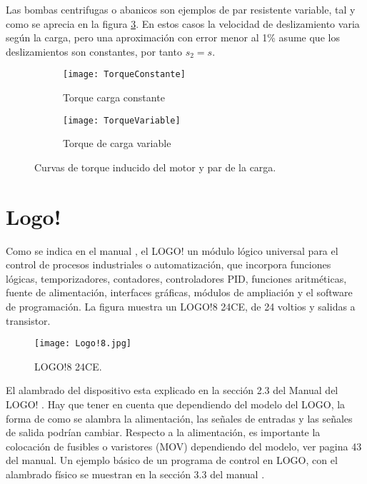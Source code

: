  Las bombas centrifugas o abanicos  son ejemplos de par resistente variable, tal y como se aprecia en la figura \ref{fig:torquevariable}. En estos casos la velocidad de deslizamiento varia según la carga, pero una aproximación con error menor al 1\% asume que los deslizamientos son constantes, por tanto  $s_2=s$.
 
 
 \begin{figure}
 	\centering
 	\begin{subfigure}[b]{0.49\textwidth}
 		\centering
 		\texttt{[image: TorqueConstante]}
 		\caption{Torque carga constante}
 		\label{fig:torqueconstante}
 	\end{subfigure}
 	\hfill
 	\begin{subfigure}[b]{0.49\textwidth}
 		\centering
 		\texttt{[image: TorqueVariable]}
 		\caption{Torque de carga variable}
 		\label{fig:torquevariable}
 	\end{subfigure}
 	\caption{Curvas de torque inducido del motor y par de la carga. \cite{Mora08}}
 \end{figure}
 

 \section{Logo!}

Como se indica en el manual \cite{LOGO1}, el LOGO! un módulo lógico universal para el control de procesos industriales o automatización, que incorpora funciones lógicas, temporizadores, contadores, controladores PID, funciones aritméticas, fuente de alimentación, interfaces gráficas, módulos de ampliación y el software de programación. La figura muestra un LOGO!8 24CE, de 24 voltios y salidas a transistor.
\begin{figure}
	\centering
	\texttt{[image: Logo!8.jpg]}
	\caption{LOGO!8 24CE.}
	\label{fig:logo8}
\end{figure}

 El alambrado del dispositivo esta explicado en la sección 2.3 del Manual del LOGO! \cite{LOGO1}. Hay que tener en cuenta que dependiendo del modelo del LOGO, la forma de como se alambra la alimentación, las señales de entradas y las señales de salida podrían cambiar. Respecto a la alimentación, es importante la colocación de fusibles o varistores (MOV) dependiendo del modelo, ver pagina 43 del manual.  Un ejemplo básico de un programa de control en LOGO, con el alambrado físico se muestran en la sección 3.3 del manual \cite{LOGO1}.
 
